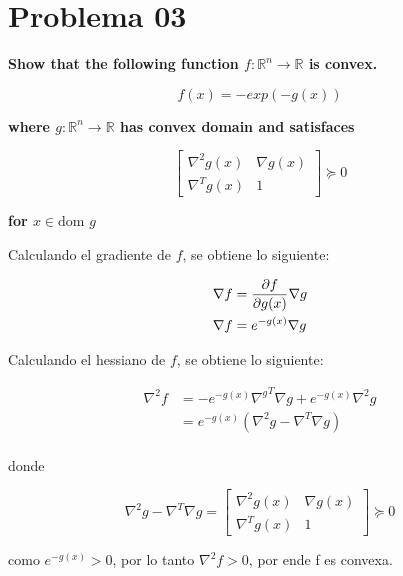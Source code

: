 \section*{Problema 03}

\textbf{Show that the following function $f: \mathbb{R}^n \rightarrow \mathbb{R}$ is convex.}

\begin{equation*}
    f(x) = -exp(-g(x))
\end{equation*}

\textbf{where $g:\mathbb{R}^n \rightarrow \mathbb{R}$ has convex domain and satisfaces}

\begin{equation*}
    \begin{bmatrix}
        \nabla^2 g(x) & \nabla g(x) \\
        \nabla^T g(x) & 1
    \end{bmatrix} \succeq 0
\end{equation*}

\textbf{for $x \in \text{dom } g$}

Calculando el gradiente de $f$, se obtiene lo siguiente:

\begin{align*}
    \nabla f & = \frac{\partial f}{\partial g(x)} \nabla g \\
    \nabla f & = e^{-g(x)} \nabla g
\end{align*}

Calculando el hessiano de $f$, se obtiene lo siguiente:

\begin{align*}
    \nabla^2 f & = -e^{-g(x)} {\nabla^g}^T \nabla g + e^{-g(x)} \nabla^2 g \\
               & = e^{-g(x)} \left (\nabla^2g -\nabla^T\nabla g \right )   \\
\end{align*}

donde

\begin{equation*}
    \nabla^2g -\nabla^T\nabla g = \begin{bmatrix}
        \nabla^2 g(x) & \nabla g(x) \\
        \nabla^T g(x) & 1
    \end{bmatrix} \succeq 0
\end{equation*}

como $e^{-g(x)}>0$, por lo tanto $\nabla^2 f>0$, por ende f es convexa.